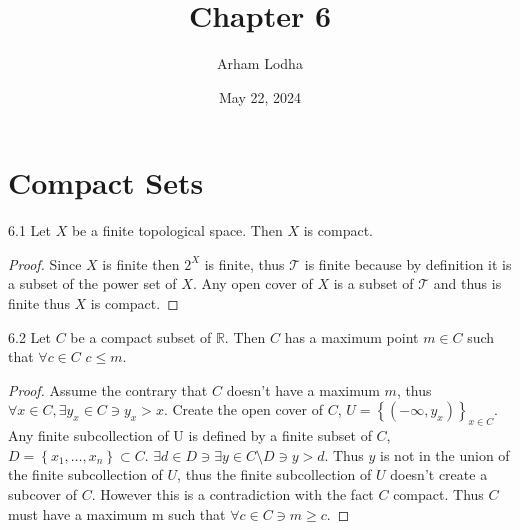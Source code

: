 \documentclass{article}
\newcommand*{\T}{\mathcal{T}}
\newcommand{\R}{\mathbb{R}}
\begin{document}
\title{Chapter 6}
\author{Arham Lodha}%
\date{May 22, 2024}%
\maketitle

\section{Compact Sets}

\begin{claim}{6.1}\label{Claim 6.1.}
    Let $X$ be a finite topological space. Then $X$ is compact.  
\end{claim}
\begin{proof}
    Since $X$ is finite then $2^X$ is finite, thus $\T$ is finite because by definition it is a subset of the power set of $X$. Any open cover of $X$ is a subset of $\T$ and thus is finite thus $X$ is compact.       
\end{proof}

\bigskip

\begin{claim}{6.2}\label{Claim 6.2.}
    Let $C$ be a compact subset of $\R$. Then $C$ has a maximum point $m \in C$ such that $\forall c \in C$ $c \leq m$.       
\end{claim}
\begin{proof}
    Assume the contrary that $C$ doesn't have a maximum $m$, thus $\forall x \in C, \exists y_x \in C \ni y_x > x$. Create the open cover of $C$, $U = \left\{ (-\infty, y_x) \right\}_{x \in C}$. Any finite subcollection of U is defined by a finite subset of $C$, $D = \left\{ x_1, \dots, x_n \right\} \subset C$. $\exists d \in D \ni \exists y \in C \setminus D \ni y > d$. Thus $y$ is not in the union of the finite subcollection of $U$, thus the finite subcollection of $U$ doesn't create a subcover of $C$. However this is a contradiction with the fact $C$ compact.  Thus $C$ must have a maximum m such that $\forall c \in C \ni m \geq c$.                          
\end{proof}

\bigskip
\end{document}
